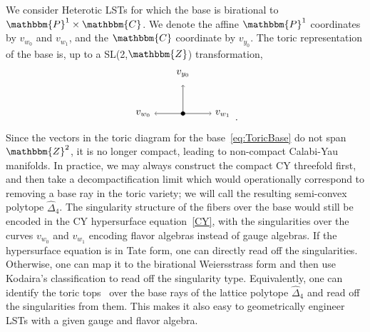 \documentclass[11pt]{article}
\numberwithin{equation}{section}
\begin{document}
We consider Heterotic LSTs for which the base is birational to $\mathbbm{P}^{1} \times \mathbbm{C}$. We denote the affine $\mathbbm{P}^{1}$ coordinates by $v_{w_{0}}$ and $v_{w_{1}}$, and the $\mathbbm{C}$ coordinate by $v_{y_{0}}$. The toric representation of the base is, up to a SL(2,$\mathbbm{Z}$) transformation,
\begin{align}
\label{eq:ToricBase}
\begin{split}
\begin{tikzpicture}
\draw[->]  (9,-5) -- (10,-5) node (mynode) at (10.4,-5){$v_{w_{1}}$};
\draw[<-]  (8,-5) -- (9,-5) node (mynode) at (7.6,-5){$v_{w_{0}}$};
\draw[->]  (9,-5) -- (9,-4) node (mynode) at (9,-3.6){$v_{y_{0}}$};
\filldraw[black] (9,-5) circle (2pt);
\end{tikzpicture}\,.
\end{split}
\end{align}
Since the vectors in the toric diagram for the base~\eqref{eq:ToricBase} do not span $\mathbbm{Z}^2$, it is no longer compact, leading to non-compact Calabi-Yau manifolds. In practice, we may always construct the compact CY threefold first, and then take a decompactification limit which would operationally correspond to removing a base ray in the toric variety; we will call the resulting semi-convex polytope $\hat{\Delta}_{4}$. The singularity structure of the fibers over the base would still be encoded in the CY hypersurface equation~\eqref{CY}, with the singularities over the curves $v_{w_{0}}$ and $v_{w_{1}}$ encoding flavor algebras instead of gauge algebras. If the hypersurface equation is in Tate form, one can directly read off the singularities. Otherwise, one can map it to the birational Weiersstrass form and then use Kodaira's classification to read off the singularity type. Equivalently, one can identify the toric tops~\cite{Bouchard:2003bu} over the base rays of the lattice polytope $\hat{\Delta}_4$ and read off the singularities from them. This makes it also easy to geometrically engineer LSTs with a given gauge and flavor algebra.
\end{document}
